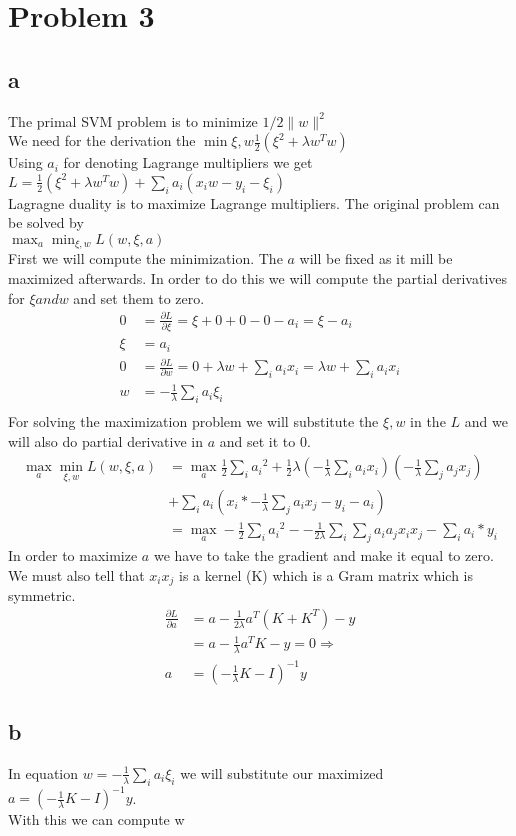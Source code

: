 \section{Problem 3}
\subsection{a}
The primal SVM problem is to minimize $1/2 \lVert{w}\rVert^2$\\
We need for the derivation the $\min\limits{\xi,w}\frac{1}{2} (\xi^2 + \lambda w^Tw)$ \\
Using $a_i$ for denoting Lagrange multipliers we get
$L = \frac{1}{2} (\xi^2 + \lambda w^Tw) + \sum_{i}{}a_i(x_iw -y_i-\xi_i)$\\
Lagragne duality is to maximize Lagrange multipliers. The original problem can be solved by \\
$\max_a\min_{\xi,w}L(w,\xi,a)$\\
First we will compute the minimization. The $a$ will be fixed as it mill be maximized afterwards.
In order to do this we will compute the partial derivatives for $\xi and w$ and set them to zero.
\begin{align*}
0 &= \frac{\partial L}{\partial \xi} = \xi + 0 + 0 - 0 - a_i = \xi - a_i\\
\xi &= a_i\\
0 &= \frac{\partial L}{\partial w} = 0 + \lambda w + \sum_{i}{}a_ix_i = \lambda w + \sum_{i}{}a_ix_i\\
w &= -\frac{1}{\lambda} \sum_{i}{}a_i\xi_i\\
\end{align*}
For solving the maximization problem we will substitute the $\xi,w$ in the $L$ and we will also do partial derivative in $a$
and set it to 0.\\
\begin{align*}
\max_a\min_{\xi,w}L(w,\xi,a) &= \max_a \frac{1}{2}\sum_i{a_i}^2 + \frac{1}{2}\lambda(-\frac{1}{\lambda}\sum_{i}{}a_ix_i) (-\frac{1}{\lambda}\sum_{j}{}a_jx_j) \\
&+ \sum_{i}{}a_i(x_i* -\frac{1}{\lambda}\sum_{j}{}a_ix_j-y_i-a_i)\\
&= \max_a-\frac{1}{2}\sum_i{a_i}^2 - -\frac{1}{2\lambda}\sum_i\sum_j a_i a_j x_i x_j - \sum_i a_i*y_i
\end{align*}
In order to maximize $a$ we have to take the gradient and make it equal to zero.
We must also tell that $x_i x_j$ is a kernel (K) which is a Gram matrix which is symmetric.
\begin{align*}
\frac{\partial L}{\partial a} &= a -\frac{1}{2\lambda}a^T(K+K^T) -y\\
&= a -\frac{1}{\lambda}a^T K -y = 0 \Rightarrow \\
a &= (-\frac{1}{\lambda}K-I)^{-1} y 
\end{align*}
\subsection{b}
In equation $w = -\frac{1}{\lambda} \sum_{i}{}a_i\xi_i$ we will substitute our maximized \\
$a = (-\frac{1}{\lambda}K-I)^{-1} y$.\\
With this we can compute w


